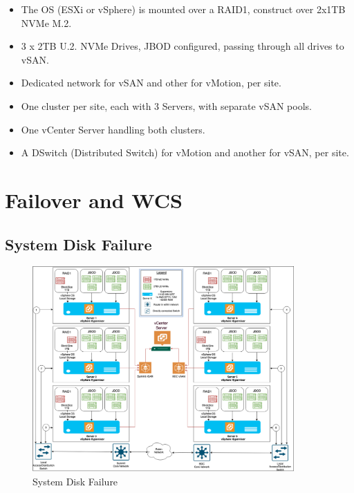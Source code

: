 \begin{itemize}
  \item The OS (ESXi or vSphere) is mounted over a RAID1, construct over 2x1TB NVMe M.2.
  \item 3 x 2TB U.2. NVMe Drives, JBOD configured, passing through all drives to vSAN.
  \item Dedicated network for vSAN and other for vMotion, per site.
  \item One cluster per site, each with 3 Servers, with separate vSAN pools.
  \item One vCenter Server handling both clusters.
  \item A DSwitch (Distributed Switch) for vMotion and another for vSAN, per site.
\end{itemize}

\newpage
\section{Failover and WCS}

\subsection{System Disk Failure}
\begin{figure}
  \includegraphics[width=10cm]{images/system_disk_failure.png}
  \centering
  \caption{System Disk Failure}
\end{figure}

